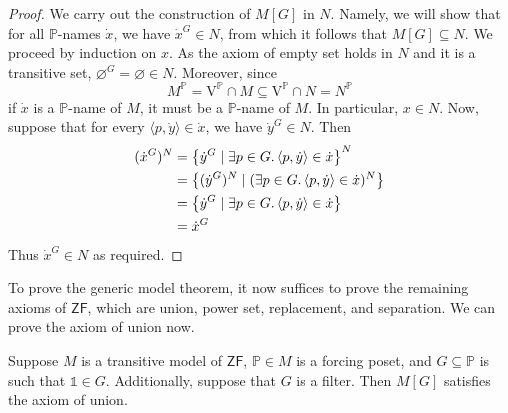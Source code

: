 \begin{proof}
    We carry out the construction of \( M[G] \) in \( N \).
    Namely, we will show that for all \( \mathbb P \)-names \( \dot x \), we have \( \dot x^G \in N \), from which it follows that \( M[G] \subseteq N \).
    We proceed by induction on \( x \).
    As the axiom of empty set holds in \( N \) and it is a transitive set, \( \varnothing^G = \varnothing \in N \).
    Moreover, since
    \[ M^{\mathbb P} = \mathrm{V}^{\mathbb P} \cap M \subseteq \mathrm{V}^{\mathbb P} \cap N = N^{\mathbb P} \]
    if \( \dot x \) is a \( \mathbb P \)-name of \( M \), it must be a \( \mathbb P \)-name of \( M \).
    In particular, \( x \in N \).
    Now, suppose that for every \( \langle p, \dot y \rangle \in \dot x \), we have \( \dot y^G \in N \).
    Then
    \begin{align*}
        (\dot x^G)^N &= \qty{\dot y^G \mid \exists p \in G.\, \langle p, \dot y \rangle \in \dot x}^N \\
        &= \qty{(\dot y^G)^N \mid (\exists p \in G.\, \langle p, \dot y \rangle \in \dot x)^N} \\
        &= \qty{\dot y^G \mid \exists p \in G.\, \langle p, \dot y \rangle \in \dot x} \\
        &= \dot x^G
    \end{align*}
    Thus \( \dot x^G \in N \) as required.
\end{proof}
To prove the generic model theorem, it now suffices to prove the remaining axioms of \( \mathsf{ZF} \), which are union, power set, replacement, and separation.
We can prove the axiom of union now.
\begin{lemma}
    Suppose \( M \) is a transitive model of \( \mathsf{ZF} \), \( \mathbb P \in M \) is a forcing poset, and \( G \subseteq \mathbb P \) is such that \( \Bbbone \in G \).
    Additionally, suppose that \( G \) is a filter.
    Then \( M[G] \) satisfies the axiom of union.
\end{lemma}
